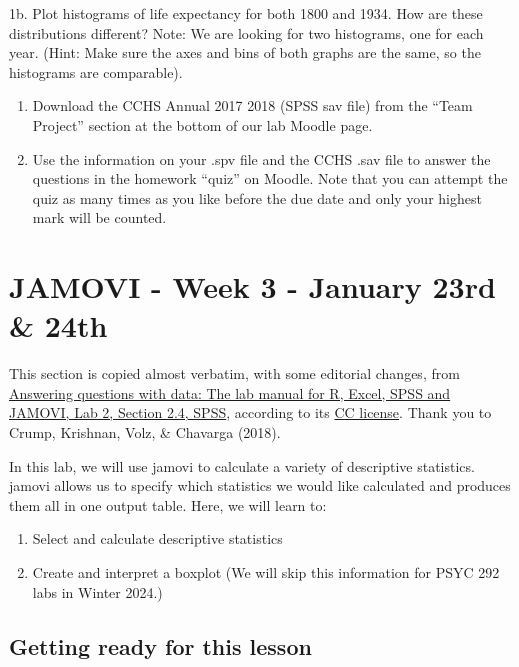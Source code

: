 \documentclass[
]{book}
\providecommand{\tightlist}{%
  \setlength{\itemsep}{0pt}\setlength{\parskip}{0pt}}
\begin{document}
1b. Plot histograms of life expectancy for both 1800 and 1934. How are these distributions different? Note: We are looking for two histograms, one for each year. (Hint: Make sure the axes and bins of both graphs are the same, so the histograms are comparable).

\begin{enumerate}
\def\labelenumi{\arabic{enumi}.}
\setcounter{enumi}{1}
\item
  Download the CCHS Annual 2017 2018 (SPSS sav file) from the ``Team Project'' section at the bottom of our lab Moodle page.
\item
  Use the information on your .spv file and the CCHS .sav file to answer the questions in the homework ``quiz'' on Moodle. Note that you can attempt the quiz as many times as you like before the due date and only your highest mark will be counted.
\end{enumerate}

\hypertarget{jamovi---week-3---january-23rd-24th}{%
\section{JAMOVI - Week 3 - January 23rd \& 24th}\label{jamovi---week-3---january-23rd-24th}}

This section is copied almost verbatim, with some editorial changes, from \href{https://www.erinmazerolle.com/statisticsLab/lab-2-descriptive-statistics-and-more-graphs.html\#spss-2}{Answering questions with data: The lab manual for R, Excel, SPSS and JAMOVI, Lab 2, Section 2.4, SPSS}, according to its \href{https://creativecommons.org/licenses/by-sa/4.0/deed.ast}{CC license}. Thank you to Crump, Krishnan, Volz, \& Chavarga (2018).

In this lab, we will use jamovi to calculate a variety of descriptive statistics. jamovi allows us to specify which statistics we would like calculated and produces them all in one output table. Here, we will learn to:

\begin{enumerate}
\def\labelenumi{\arabic{enumi}.}
\tightlist
\item
  Select and calculate descriptive statistics
\item
  Create and interpret a boxplot (We will skip this information for PSYC 292 labs in Winter 2024.)
\end{enumerate}

\hypertarget{getting-ready-for-this-lesson}{%
\subsection{Getting ready for this lesson}\label{getting-ready-for-this-lesson}}
\end{document}
